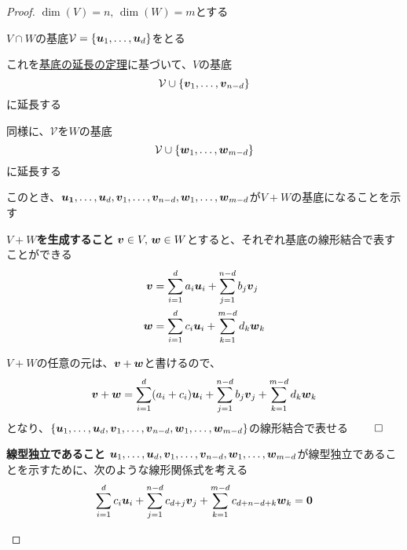 \documentclass[../../../topic_linear-algebra]{subfiles}
\begin{document}
\begin{proof}
  $\dim(V) = n, \, \dim(W) = m$とする

  \br

  $V \cap W$の基底$\mathcal{V} = \{ \vb*{u}_1,\dots, \vb*{u}_d \}$をとる

  これを\hyperref[thm:basis-extension]{基底の延長の定理}に基づいて、$V$の基底
  \begin{equation*}
    \mathcal{V} \cup \{ \vb*{v}_1, \dots, \vb*{v}_{n-d} \}
  \end{equation*}
  に延長する

  同様に、$\mathcal{V}$を$W$の基底
  \begin{equation*}
    \mathcal{V} \cup \{ \vb*{w}_1, \dots, \vb*{w}_{m-d} \}
  \end{equation*}
  に延長する

  \br

  このとき、$\vb*{u_1}, \dots, \vb*{u}_d, \vb*{v}_1, \dots, \vb*{v}_{n-d}, \vb*{w}_1, \dots, \vb*{w}_{m-d}$が$V + W$の基底になることを示す

  \begin{subpattern}{\bfseries $V+W$を生成すること}
    $\vb*{v} \in V, \, \vb*{w} \in W$とすると、それぞれ基底の線形結合で表すことができる
    \begin{align*}
      \vb*{v} & = \sum_{i=1}^d a_i \vb*{u}_i + \sum_{j=1}^{n-d} b_j \vb*{v}_j \\
      \vb*{w} & = \sum_{i=1}^d c_i \vb*{u}_i + \sum_{k=1}^{m-d} d_k \vb*{w}_k
    \end{align*}

    \br

    $V+W$の任意の元は、$\vb*{v} + \vb*{w}$と書けるので、
    \begin{equation*}
      \vb*{v} + \vb*{w} = \sum_{i=1}^d (a_i + c_i) \vb*{u}_i + \sum_{j=1}^{n-d} b_j \vb*{v}_j + \sum_{k=1}^{m-d} d_k \vb*{w}_k
    \end{equation*}
    となり、$\{ \vb*{u}_1, \dots, \vb*{u}_d, \vb*{v}_1, \dots, \vb*{v}_{n-d}, \vb*{w}_1, \dots, \vb*{w}_{m-d} \}$の線形結合で表せる $\qed$
  \end{subpattern}

  \begin{subpattern}{\bfseries 線型独立であること}
    $\vb*{u}_1, \dots, \vb*{u}_d, \vb*{v}_1, \dots, \vb*{v}_{n-d}, \vb*{w}_1, \dots, \vb*{w}_{m-d}$が線型独立であることを示すために、次のような線形関係式を考える
    \begin{equation*}
      \sum_{i=1}^d c_i \vb*{u}_i + \sum_{j=1}^{n-d} c_{d+j} \vb*{v}_j + \sum_{k=1}^{m-d} c_{d+n-d+k} \vb*{w}_k = \vb*{0}
    \end{equation*}


\end{subpattern}
\end{proof}
\end{document}
